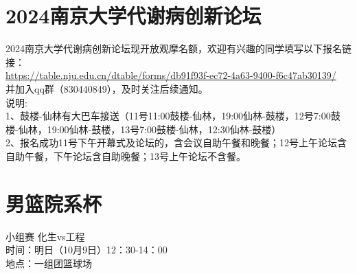 \documentclass[letterpaper, 12pt]{article}
\begin{document}
\begin{multicols}{2}
\section{2024南京大学代谢病创新论坛}
2024南京大学代谢病创新论坛现开放观摩名额，欢迎有兴趣的同学填写以下报名链接：\\
\url{https://table.nju.edu.cn/dtable/forms/db91f93f-ec72-4a63-9400-f6c47ab30139/}\\
并加入qq群（830440849），及时关注后续通知。\\
说明:\\
1、鼓楼-仙林有大巴车接送（11号11:00鼓楼-仙林，19:00仙林-鼓楼，12号7:00鼓楼-仙林，19:00仙林-鼓楼，13号7:00鼓楼-仙林，12:30仙林-鼓楼）\\
2、报名成功11号下午开幕式及论坛的，含会议自助午餐和晚餐；12号上午论坛含自助午餐，下午论坛含自助晚餐；13号上午论坛不含餐。\\


\section{男篮院系杯}
小组赛 化生vs工程\\
时间：明日（10月9日）12：30-14：00\\
地点：一组团篮球场
\end{multicols} 
\end{document}
